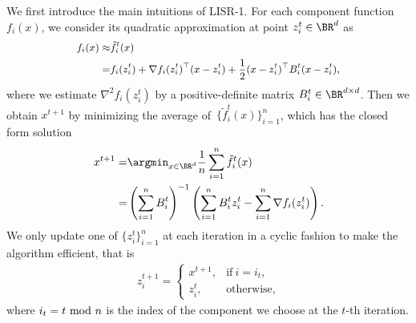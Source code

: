 We first introduce the main intuitions of LISR-1.
For each component function $f_i(x)$, we consider its quadratic approximation at point $z_i^t\in\BR^d$ as
\begin{align*}
\small\begin{split}    
f_i(x) \approx & {\tilde f}_i^t(x) \\
= & f_i (z_i^t) + \nabla f_i (z_i^t)^{\top} (x - z_i^t) + \frac{1}{2}(x- z_i^t)^{\top} B_i^t (x - z_i^t),
\end{split}
\end{align*}
where we estimate $\nabla^2 f_i(z_i^t)$ by a positive-definite matrix $B_i^t\in\BR^{d\times d}$.
Then we obtain $x^{t+1}$ by minimizing the average of~$\{\tilde f_i^t(x)\}_{i=1}^n$, which has the closed form solution
\begin{align}\label{cur_iter_update}
\begin{split}    
    x^{t+1} =& \argmin_{x\in\BR^d} \frac{1}{n}\sum_{i=1}^n\tilde f_i^t (x) \\
    =& \left( \sum_{i=1}^n B_{i}^{t} \right)^{-1} \left( \sum_{i=1}^n B_{i}^{t} z_{i}^{t} - \sum_{i=1}^n \nabla f_i(z_i^{t})\right).
\end{split}
\end{align}
We only update one of $\{z_i^t\}_{i=1}^n$ at each iteration
in a cyclic fashion to make the algorithm efficient, that is
\begin{align}\label{active_idx_update}
    z_i^{t+1} = \begin{cases}
        x^{t+1},  & \text{if}~ i=i_t, \\[0.1cm]
        z_i^{t},  & \text{otherwise},
    \end{cases}
\end{align}
where $i_t=t~{\rm mod}~n$ is the index of the component
we choose at the $t$-th iteration.

